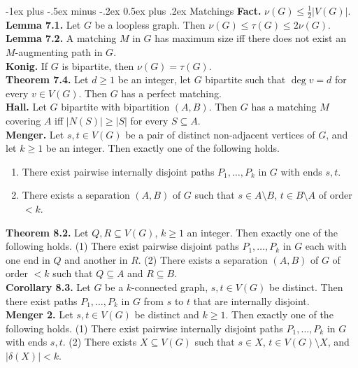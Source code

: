 \documentclass[10pt,landscape]{article}
\makeatletter
\renewcommand{\section}{\@startsection{section}{1}{0mm}%
                                {-1ex plus -.5ex minus -.2ex}%
                                {0.5ex plus .2ex}%
                                {\normalfont\large\bfseries}}
\makeatother
\begin{document}
\begin{multicols}{3}
\section{Matchings}
\textbf{Fact.} \( \nu (G) \leq \frac{1}{2} |V(G)|. \) \\
\textbf{Lemma 7.1.} Let \( G \) be a loopless graph. Then \( \nu (G) \leq \tau (G) \leq 2 \nu(G) \). \\
\textbf{Lemma 7.2.} A matching \( M \) in \( G \) has maximum size iff there does not exist an \( M \)-augmenting path in \( G \). \\
\textbf{Konig.} If \( G \) is bipartite, then \( \nu (G) = \tau (G) \). \\
\textbf{Theorem 7.4.} Let \( d \geq 1 \) be an integer, let \( G \) bipartite such that \( \deg v = d \) for every \( v \in  V(G) \). Then \( G \) has a perfect matching. \\
\textbf{Hall.} Let \( G \) bipartite with bipartition \( (A,B) \). Then \( G \) has a matching \( M \) covering \( A \) iff \( |N(S)| \geq |S| \) for every \( S \subseteq A \). \\
\textbf{Menger.} Let \( s,t \in V(G) \) be a pair of distinct non-adjacent vertices of \( G \), and let \( k \geq 1 \) be an integer. Then exactly one of the following holds.
\begin{enumerate}
	\item There exist pairwise internally disjoint paths \( P_1, \hdots , P_k \) in \( G \) with ends \( s,t \).
	\item There exists a separation \( (A,B) \) of \( G \) such that \( s \in A \setminus B \), \( t \in B \setminus A \) of order \( < k \).
\end{enumerate}
\textbf{Theorem 8.2.} Let \( Q, R \subseteq V(G) \), \( k \geq 1 \) an integer. Then exactly one of the following holds. (1) There exist pairwise disjoint paths \( P_1, \hdots , P_k \) in \( G \) each with one end in \( Q \) and another in \( R \). (2) There exists a separation \( (A,B) \) of \( G \) of order \( < k \) such that \( Q \subseteq A \) and \( R \subseteq B \). \\
\textbf{Corollary 8.3.} Let \( G \) be a \( k \)-connected graph, \( s,t \in V(G) \) be distinct. Then there exist paths \( P_1, \hdots , P_k \) in \( G \) from \( s \) to \( t \) that are internally disjoint. \\
\textbf{Menger 2.} Let \( s, t \in V(G) \) be distinct and \( k \geq 1 \). Then exactly one of the following holds. (1) There exist pairwise internally disjoint paths \( P_1, \hdots , P_k \) in \( G \) with ends \( s,t \). (2) There exists \(  X \subseteq V(G) \) such that \( s \in X \), \( t \in V(G) \setminus X \), and \( |\delta (X)| < k \).

\end{multicols}
\end{document}
